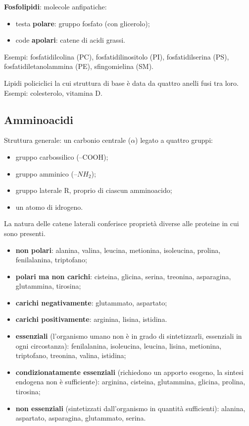\textbf{Fosfolipidi}: molecole anfipatiche:
\begin{itemize}
  \item testa \textbf{polare}: gruppo fosfato (con glicerolo);
  \item code \textbf{apolari}: catene di acidi grassi.
\end{itemize}
Esempi: fosfatidilcolina (PC), fosfatidilinositolo (PI), fosfatidilserina (PS), fosfatidiletanolammina (PE), sfingomielina (SM).

Lipidi policiclici la cui struttura di base è data da quattro anelli fusi tra loro. Esempi: colesterolo, vitamina D.

\subsection{Amminoacidi}

Struttura generale: un carbonio centrale ($\alpha$) legato a quattro gruppi:
\begin{itemize}
  \item gruppo carbossilico (--COOH);
  \item gruppo amminico (--$NH_2$);
  \item gruppo laterale R, proprio di ciascun amminoacido;
  \item un atomo di idrogeno.
\end{itemize}
La natura delle catene laterali conferisce proprietà diverse alle proteine in cui sono presenti.

\begin{itemize}
  \item \textbf{non polari}: alanina, valina, leucina, metionina, isoleucina, prolina, fenilalanina, triptofano;
  \item \textbf{polari ma non carichi}: cisteina, glicina, serina, treonina, asparagina, glutammina, tirosina;
  \item \textbf{carichi negativamente}: glutammato, aspartato;
  \item \textbf{carichi positivamente}: arginina, lisina, istidina.
\end{itemize}

\begin{itemize}
  \item \textbf{essenziali} (l'organismo umano non è in grado di sintetizzarli, essenziali in ogni circostanza): fenilalanina, isoleucina, leucina, lisina, metionina, triptofano, treonina, valina, istidina;
  \item \textbf{condizionatamente essenziali} (richiedono un apporto esogeno, la sintesi endogena non è sufficiente): arginina, cisteina, glutammina, glicina, prolina, tirosina;
  \item \textbf{non essenziali} (sintetizzati dall'organismo in quantità sufficienti): alanina, aspartato, asparagina, glutammato, serina.
\end{itemize}

